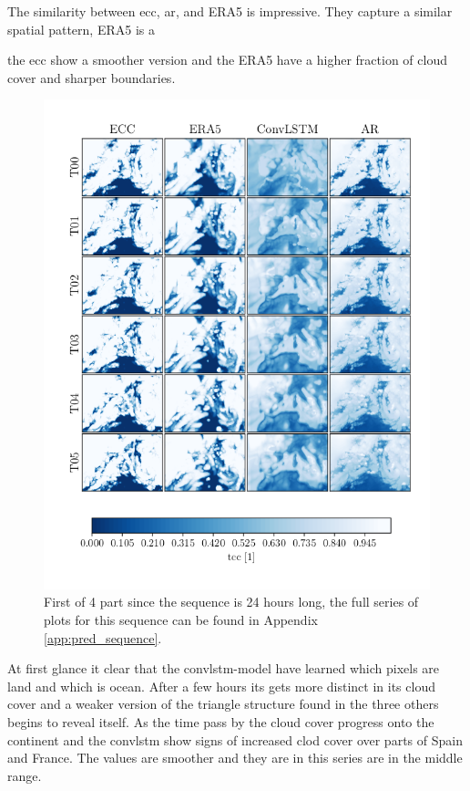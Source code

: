 The similarity between \acrshort{ecc}, \acrshort{ar}, and ERA5 is impressive. They capture a similar spatial pattern, ERA5 is a 

the \acrshort{ecc} show a smoother version and the ERA5 have a higher fraction of cloud cover and sharper boundaries. 
\begin{figure}[ht]
    \centering
    \includegraphics[sale=0.1]{python_figs/comparting_seq_part_1_of4.png}
    \caption{First of 4 part since the sequence is 24 hours long, the full series of plots for this sequence can be found in Appendix \ref{app:pred_sequence}.}
    \label{fig:target_predict_era5_horizontal}
\end{figure}
At first glance it clear that the \acrshort{convlstm}-model have learned which pixels are land and which is ocean. After a few hours its gets more distinct in its cloud cover and a weaker version of the triangle structure found in the three others begins to reveal itself. As the time pass by the cloud cover progress onto the continent and the \acrshort{convlstm} show signs of increased clod cover over parts of Spain and France.
The values are smoother and they are in this series are in the middle range.

